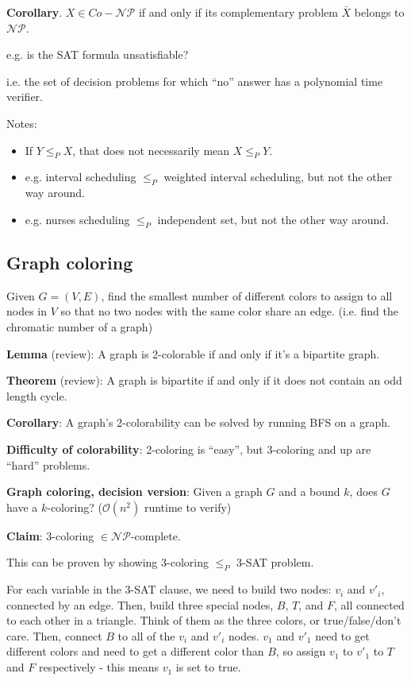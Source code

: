 \documentclass{article}
\newcommand{\Oh}{\mathcal{O}}
\begin{document}
\textbf{Corollary}. $X \in Co-\mathcal{NP}$ if and only if its complementary problem $\bar{X}$ belongs to $\mathcal{NP}$.

e.g. is the SAT formula unsatisfiable?

i.e. the set of decision problems for which ``no'' answer has a polynomial time verifier.

Notes:
\begin{itemize}
    \item If $Y \leq_P X$, that does not necessarily mean $X \leq_P Y$.
    \item e.g. interval scheduling $\leq_P$ weighted interval scheduling, but not the other way around.
    \item e.g. nurses scheduling $\leq_P$ independent set, but not the other way around.
\end{itemize}

\subsection{Graph coloring}
Given $G = (V, E)$, find the smallest number of different colors to assign to all nodes in $V$ so that no two nodes with the same color share an edge. (i.e. find the chromatic number of a graph)

\textbf{Lemma} (review): A graph is 2-colorable if and only if it's a bipartite graph.

\textbf{Theorem} (review): A graph is bipartite if and only if it does not contain an odd length cycle.

\textbf{Corollary}: A graph's 2-colorability can be solved by running BFS on a graph.

\textbf{Difficulty of colorability}: 2-coloring is ``easy'', but 3-coloring and up are ``hard'' problems.

\textbf{Graph coloring, decision version}: Given a graph $G$ and a bound $k$, does $G$ have a $k$-coloring? ($\Oh(n^2)$ runtime to verify)

\textbf{Claim}: 3-coloring $\in \mathcal{NP}$-complete.

This can be proven by showing 3-coloring $\leq_P$ 3-SAT problem.

For each variable in the 3-SAT clause, we need to build two nodes: $v_i$ and $v'_i$, connected by an edge. Then, build three special nodes, $B$, $T$, and $F$, all connected to each other in a triangle. Think of them as the three colors, or true/false/don't care. Then, connect $B$ to all of the $v_i$ and $v'_i$ nodes. $v_1$ and $v'_1$ need to get different colors and need to get a different color than $B$, so assign $v_1$ to $v'_1$ to $T$ and $F$ respectively - this means $v_1$ is set to true.
\end{document}
